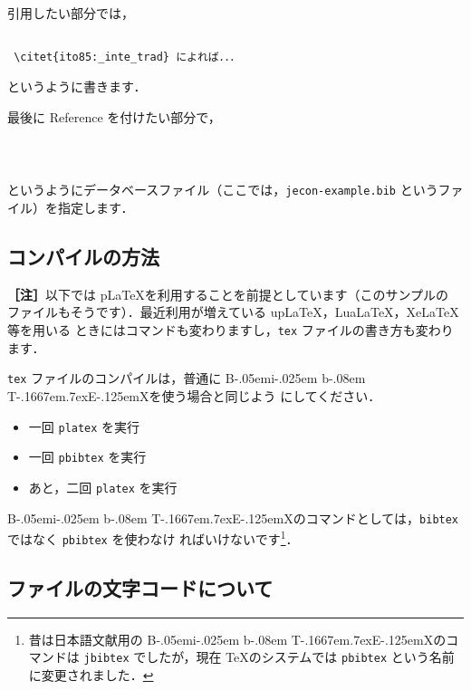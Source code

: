 \documentclass[a4j,10pt]{jarticle}
\def\BibTeX{{\rm B\kern-.05em{\sc i\kern-.025em b}\kern-.08em
    T\kern-.1667em\lower.7ex\hbox{E}\kern-.125emX}}
\begin{document}
引用したい部分では，

\begin{screen}
 \begin{verbatim}
        
 \citet{ito85:_inte_trad} によれば．．．
 \end{verbatim}
\end{screen}

というように書きます．

最後に Reference を付けたい部分で，

\begin{screen}
 \begin{verbatim}
        
 
 \end{verbatim}
\end{screen}

というようにデータベースファイル（ここでは，\texttt{jecon-example.bib} というファ
イル）を指定します．

\subsection{コンパイルの方法}

\begin{screen}
\textbf{［注］}以下では p\LaTeX を利用することを前提としています（このサンプルの
ファイルもそうです）．最近利用が増えている upLaTeX，LuaLaTeX，XeLaTeX 等を用いる
ときにはコマンドも変わりますし，\texttt{tex} ファイルの書き方も変わります．
\end{screen}
\vspace*{1em}

\texttt{tex} ファイルのコンパイルは，普通に \BibTeX を使う場合と同じよう
にしてください．

\begin{itemize}
 \item 一回 \texttt{platex} を実行
 \item 一回 \texttt{pbibtex} を実行
 \item あと，二回 \texttt{platex} を実行
\end{itemize}

\BibTeX のコマンドとしては，\texttt{bibtex} ではなく \texttt{pbibtex} を使わなけ
ればいけないです\footnote{昔は日本語文献用の \BibTeX のコマンドは
\texttt{jbibtex} でしたが，現在 \TeX のシステムでは \texttt{pbibtex} という名前
に変更されました．}．

\subsection{ファイルの文字コードについて}
\end{document}
